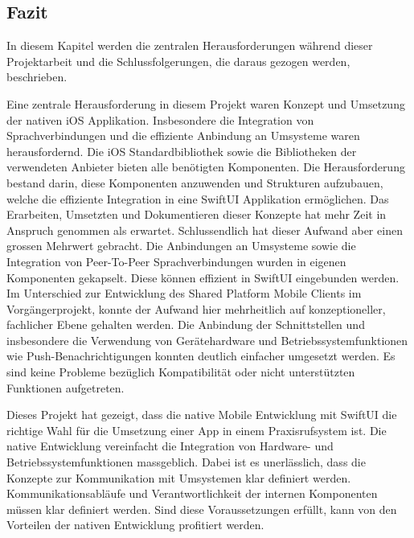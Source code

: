\subsection{Fazit}

In diesem Kapitel werden die zentralen Herausforderungen während dieser Projektarbeit und die Schlussfolgerungen, die daraus gezogen werden, beschrieben.

Eine zentrale Herausforderung in diesem Projekt waren Konzept und Umsetzung der nativen iOS Applikation.
Insbesondere die Integration von Sprachverbindungen und die effiziente Anbindung an Umsysteme waren herausfordernd.
Die iOS Standardbibliothek sowie die Bibliotheken der verwendeten Anbieter bieten alle benötigten Komponenten.
Die Herausforderung bestand darin, diese Komponenten anzuwenden und Strukturen aufzubauen, welche die effiziente Integration in eine SwiftUI Applikation ermöglichen.
Das Erarbeiten, Umsetzten und Dokumentieren dieser Konzepte hat mehr Zeit in Anspruch genommen als erwartet.
Schlussendlich hat dieser Aufwand aber einen grossen Mehrwert gebracht.
Die Anbindungen an Umsysteme sowie die Integration von Peer-To-Peer Sprachverbindungen wurden in eigenen Komponenten gekapselt.
Diese können effizient in SwiftUI eingebunden werden.
Im Unterschied zur Entwicklung des Shared Platform Mobile Clients im Vorgängerprojekt, konnte der Aufwand hier mehrheitlich auf konzeptioneller, fachlicher Ebene gehalten werden.
Die Anbindung der Schnittstellen und insbesondere die Verwendung von Gerätehardware und Betriebssystemfunktionen wie Push-Benachrichtigungen konnten deutlich einfacher umgesetzt werden.
Es sind keine Probleme bezüglich Kompatibilität oder nicht unterstützten Funktionen aufgetreten.

Dieses Projekt hat gezeigt, dass die native Mobile Entwicklung mit SwiftUI die richtige Wahl für die Umsetzung einer App in einem Praxisrufsystem ist.
Die native Entwicklung vereinfacht die Integration von Hardware- und Betriebssystemfunktionen massgeblich.
Dabei ist es unerlässlich, dass die Konzepte zur Kommunikation mit Umsystemen klar definiert werden.
Kommunikationsabläufe und Verantwortlichkeit der internen Komponenten müssen klar definiert werden.
Sind diese Voraussetzungen erfüllt, kann von den Vorteilen der nativen Entwicklung profitiert werden.

